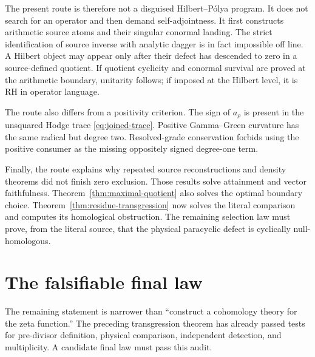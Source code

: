 \documentclass[11pt]{article}
\theoremstyle{definition}
\theoremstyle{remark}
\begin{document}
The present route is therefore not a disguised Hilbert--P\'olya program.
It does not search for an operator and then demand self-adjointness.  It
first constructs arithmetic source atoms and their singular conormal
landing.  The strict identification of source inverse with analytic dagger is
in fact impossible off line.  A Hilbert object may appear only after their
defect has descended to zero in a source-defined quotient.  If quotient
cyclicity and conormal survival are proved at the arithmetic boundary,
unitarity follows; if imposed at the Hilbert level, it is RH in operator
language.

The route also differs from a positivity criterion.  The sign of
\(a_\rho\) is present in the unsquared Hodge trace
\eqref{eq:joined-trace}.  Positive Gamma--Green curvature has the same
radical but degree two.  Resolved-grade conservation forbids using the
positive consumer as the missing oppositely signed degree-one term.

Finally, the route explains why repeated source reconstructions and density
theorems did not finish zero exclusion.  Those results solve attainment and
vector faithfulness.  Theorem~\ref{thm:maximal-quotient} also solves the
optimal boundary choice.  Theorem~\ref{thm:residue-transgression} now solves
the literal comparison and computes its homological obstruction.  The
remaining selection law must prove, from the literal source, that the
physical paracyclic defect is cyclically null-homologous.

\clearpage
\section{The falsifiable final law}

The remaining statement is narrower than ``construct a cohomology theory
for the zeta function.''  The preceding transgression theorem has already
passed tests for pre-divisor definition, physical comparison, independent
detection, and multiplicity.  A candidate final law must pass this audit.
\end{document}
